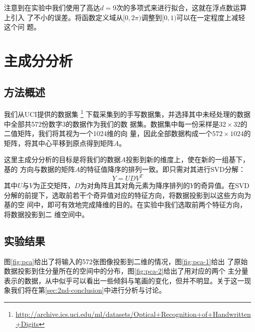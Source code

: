 \documentclass[10pt,a4paper]{article}
\theoremstyle{mythm}%
\numberwithin{equation}{section}
\begin{document}
\begin{CJK*}{UTF8}{wqyzh}
注意到在实验中我们使用了高达$d=9$次的多项式来进行拟合，这就在浮点数运算上引入
了不小的误差。将函数定义域从$[0,2\pi)$调整到$[0,1)$可以在一定程度上减轻这个问
题。

\section{主成分分析}

\subsection{方法概述}

我们从UCI提供的数据集
\footnote{\url{http://archive.ics.uci.edu/ml/datasets/Optical+Recognition+of+Handwritten+Digits}}
下载采集到的手写数据集，并选择其中未经处理的数据中全部共572份数字3的数据作为我们的数
据集。数据集中每一份采样是$32\times 32$的二值矩阵，我们将其视为一个1024维的向
量，因此全部数据构成一个$572\times 1024$的矩阵，将其中心平移到原点得到矩阵$A$。

这里主成分分析的目标是将我们的数据$A$投影到新的维度上，使在新的一组基下，基的
方向与数据的矩阵$A$的特征值降序的排列一致。即只需对其进行SVD分解：
\begin{equation}
    Y = U D V^T
\end{equation}
其中$U$与$V$为正交矩阵，$D$为对角阵且其对角元素为降序排列的$Y$的奇异值。在SVD
分解的前提下，选取前若干个奇异值对应的特征方向，将数据投影到以这些方向为基的空
间中，即可有效地完成降维的目的。在实验中我们选取前两个特征方向，将数据投影到二
维空间中。


\subsection{实验结果}

图\ref{fig:pca}给出了将输入的572张图像投影到二维的情况，图\ref{fig:pca-1}给出
了原始数据投影到住分量所在的空间中的分布，图\ref{fig:pca-2}给出了用对应的两个
主分量表示的数据，从中似乎可以看出一些倾斜与笔画的变化，但并不明显。关于这一现
象我们将在第\ref{sec:2nd-conclusion}中进行分析与讨论。


\end{CJK*}
\end{document}
